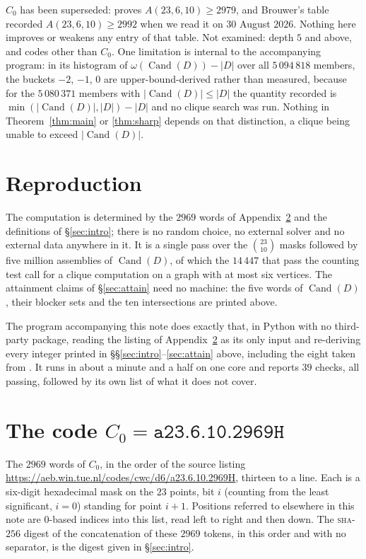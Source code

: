 \documentclass[11pt]{amsart}
\theoremstyle{remark}
\DeclareMathOperator{\Cand}{Cand}
\begin{document}
$C_0$ has been superseded: \cite{Lys} proves $A(23,6,10)\ge 2979$, and Brouwer's table
\cite{AEB} recorded $A(23,6,10)\ge 2992$ when we read it on $30$ August $2026$. Nothing here
improves or weakens any entry of that table. Not examined: depth $5$ and above, and codes
other than $C_0$. One limitation is internal to the accompanying program: in its histogram of
$\omega(\Cand(D))-|D|$ over all $5\,094\,818$ members, the buckets $-2$, $-1$, $0$ are
upper-bound-derived rather than measured, because for the $5\,080\,371$ members with
$|\Cand(D)|\le|D|$ the quantity recorded is $\min(|\Cand(D)|,|D|)-|D|$ and no clique search was
run. Nothing in Theorem~\ref{thm:main} or \ref{thm:sharp} depends on that distinction, a clique
being unable to exceed $|\Cand(D)|$.

\section{Reproduction}\label{sec:repro}

The computation is determined by the $2969$ words of Appendix~\ref{app:code} and the
definitions of \S\ref{sec:intro}; there is no random choice, no external solver and no external
data anywhere in it. It is a single pass over the $\binom{23}{10}$ masks followed by five
million assemblies of $\Cand(D)$, of which the $14\,447$ that pass the counting test call for a
clique computation on a graph with at most six vertices. The attainment claims of
\S\ref{sec:attain} need no machine: the five words of $\Cand(D)$, their blocker sets and the ten
intersections are printed above.

The program accompanying this note does exactly that, in Python with no third-party package,
reading the listing of Appendix~\ref{app:code} as its only input and re-deriving every integer
printed in \S\S\ref{sec:intro}--\ref{sec:attain} above, including the eight taken from
\cite{Lys}. It runs in about a minute and a half on one core and reports $39$ checks, all
passing, followed by its own list of what it does not cover.

\appendix

\section{The code $C_0=\texttt{a23.6.10.2969H}$}\label{app:code}

The $2969$ words of $C_0$, in the order of the source listing
\url{https://aeb.win.tue.nl/codes/cwc/d6/a23.6.10.2969H}, thirteen to a line. Each is a
six-digit
hexadecimal mask on the $23$ points, bit $i$ (counting from the least significant, $i=0$)
standing for point $i+1$. Positions referred to elsewhere in this note are $0$-based indices
into this list, read left to right and then down. The \textsc{sha}-$256$ digest of the
concatenation of these $2969$ tokens, in this order and with no separator, is the digest given
in \S\ref{sec:intro}.
\end{document}
